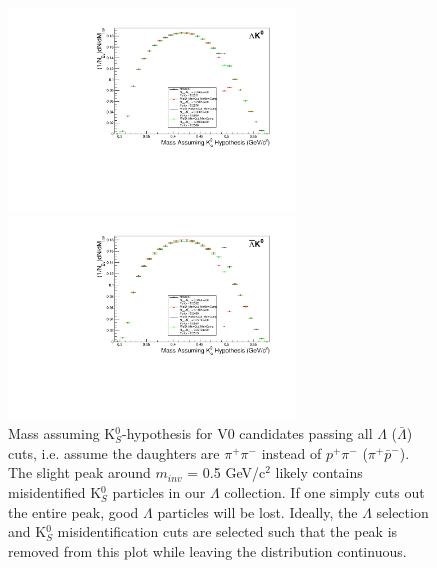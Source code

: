 \documentclass[../AnalysisNoteJBuxton.tex]{subfiles}
\begin{document}
\begin{figure}[h]
\begin{minipage}{18pc}
\includegraphics[width=18pc]{3_DataSelection/Figures/MassAssHypotheses/canMassAssK0HypCompare_LamK0_wNoMisID.pdf}
\end{minipage}\hspace{2pc}
\begin{minipage}{18pc}
\includegraphics[width=18pc]{3_DataSelection/Figures/MassAssHypotheses/canMassAssK0HypCompare_ALamK0_wNoMisID.pdf}
\end{minipage} 
\caption[K$^{0}_{S}$ contamination in $\Lambda$($\bar{\Lambda}$) collection]{Mass assuming K$^{0}_{S}$-hypothesis for V0 candidates passing all $\Lambda$ ($\bar{\Lambda}$) cuts, i.e. assume the daughters are $\pi^{+}\pi^{-}$ instead of $p^{+}\pi^{-}$ ($\pi^{+}\bar{p}^{-}$).  The slight peak around $m_{inv}$ = 0.5 GeV/c$^{2}$ likely contains misidentified K$^{0}_{S}$ particles in our $\Lambda$ collection.  If one simply cuts out the entire peak, good $\Lambda$ particles will be lost.  Ideally, the $\Lambda$ selection and K$^{0}_{S}$ misidentification cuts are selected such that the peak is removed from this plot while leaving the distribution continuous.}
  \label{fig:MassAssK0ShortHyp_cLamK0}
\end{figure}
\end{document}
